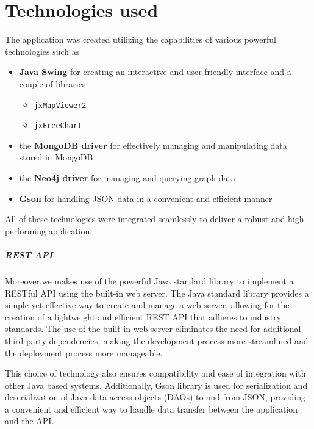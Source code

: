\chapter{Technologies used}

The application was created utilizing the capabilities of various powerful technologies such as
\begin{itemize}
	\item \textbf{Java Swing} for creating an interactive and user-friendly interface and a couple of libraries:
	
	\begin{itemize}
		\item \texttt{jxMapViewer2}
		
		\item \texttt{jxFreeChart}
	\end{itemize}
	
	\item the \textbf{MongoDB driver} for effectively managing and manipulating data stored in MongoDB
	\item the \textbf{Neo4j driver} for managing and querying graph data
	\item \textbf{Gson} for handling JSON data in a convenient and efficient manner
\end{itemize}
All of these technologies were integrated seamlessly to deliver a robust and high-performing application.

\paragraph{REST API}
Moreover,we makes use of the powerful Java standard library to implement a RESTful API using the built-in web server. The Java standard library provides a simple yet effective way to create and manage a web server, allowing for the creation of a lightweight and efficient REST API that adheres to industry standards. The use of the built-in web server eliminates the need for additional third-party dependencies, making the development process more streamlined and the deployment process more manageable. 

This choice of technology also ensures compatibility and ease of integration with other Java based systems. Additionally, Gson library is used for serialization and deserialization of Java data access objects (DAOs) to and from JSON, providing a convenient and efficient way to handle data transfer between the application and the API.


